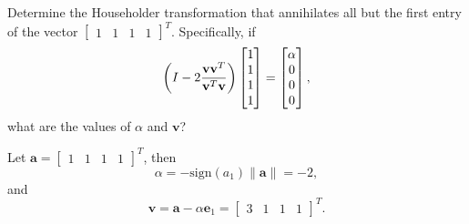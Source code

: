 \begin{pro}
  Determine the Householder transformation that
  annihilates all but the first entry of the vector $
  \begin{bmatrix}
    1 & 1 & 1 & 1
  \end{bmatrix}^T$.
  Specifically, if
  \begin{displaymath}
    \left( I - 2 \frac{\mathbf{v}\mathbf{v}^T}{\mathbf{v}^T\mathbf{v}}\right)
    \begin{bmatrix}
      1 \\
      1 \\
      1 \\
      1
    \end{bmatrix}
    =
    \begin{bmatrix}
      \alpha \\
      0 \\
      0 \\
      0
    \end{bmatrix},
  \end{displaymath}
  what are the values of $\alpha$ and $\mathbf{v}$?
\end{pro}

\begin{sol}
  Let $\mathbf{a}=
  \begin{bmatrix}
    1 & 1 & 1 & 1
  \end{bmatrix}^T$,
  then
  \begin{displaymath}
    \alpha = -\mathrm{sign}(a_1)\|\mathbf{a}\| = -2,
  \end{displaymath}
  and
  \begin{displaymath}
    \mathbf{v} = \mathbf{a} - \alpha\mathbf{e}_1 =
    \begin{bmatrix}
      3 & 1 & 1 &1
    \end{bmatrix}^T.
  \end{displaymath}
\end{sol}
